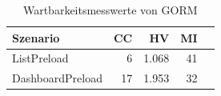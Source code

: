 \begin{table}[ht]
\centering
\caption{Wartbarkeitsmesswerte von GORM}
\begin{tabular}{lrrrr}
\toprule
Szenario & CC & HV & MI \\
\midrule
	ListPreload & 6 & 1.068 & 41 \\
	DashboardPreload & 17 & 1.953 & 32 \\
\bottomrule
\end{tabular}
\label{tab:wartbarkeit_gorm}
\end{table}
	